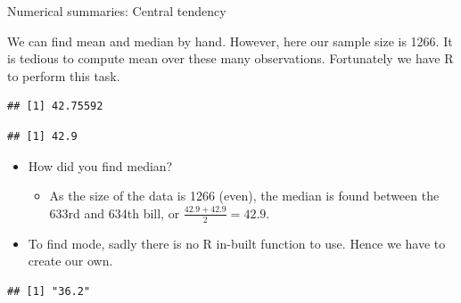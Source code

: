 \documentclass[ignorenonframetext,]{beamer}
\newenvironment{Shaded}{\begin{snugshade}}{\end{snugshade}}
\newcommand{\KeywordTok}[1]{\textcolor[rgb]{0.13,0.29,0.53}{\textbf{#1}}}
\newcommand{\OperatorTok}[1]{\textcolor[rgb]{0.81,0.36,0.00}{\textbf{#1}}}
\newcommand{\NormalTok}[1]{#1}
\providecommand{\tightlist}{%
  \setlength{\itemsep}{0pt}\setlength{\parskip}{0pt}}
\begin{document}
\begin{frame}[fragile]{Numerical summaries: Central tendency}

We can find mean and median by hand. However, here our sample size is
1266. It is tedious to compute mean over these many observations.
Fortunately we have R to perform this task.

\begin{Shaded}
\end{Shaded}

\begin{verbatim}
## [1] 42.75592
\end{verbatim}

\begin{Shaded}
\end{Shaded}

\begin{verbatim}
## [1] 42.9
\end{verbatim}

\begin{itemize}
\item
  How did you find median?

  \begin{itemize}
  \tightlist
  \item
    As the size of the data is 1266 (even), the median is found between
    the 633rd and 634th bill, or \(\frac{42.9+42.9}{2}=42.9\).
  \end{itemize}
\item
  To find mode, sadly there is no R in-built function to use. Hence we
  have to create our own.
\end{itemize}

\begin{Shaded}
\end{Shaded}

\begin{verbatim}
## [1] "36.2"
\end{verbatim}

\end{frame}
\end{document}
